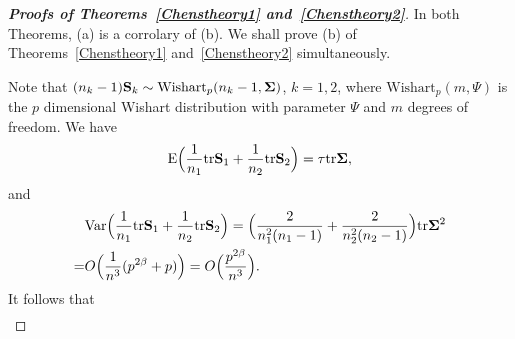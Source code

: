 \documentclass[times,sort&compress,3p]{elsarticle}
\newcommand{\mytr}{ {\rm tr} }
\newcommand{\myE}{ {\rm E} }
\newcommand{\myVar}{ {\rm Var} }
\theoremstyle{plain}
\theoremstyle{definition}
\theoremstyle{remark}
\begin{document}
\begin{appendices}
\begin{proof}[\textbf{Proofs of Theorems~\ref{Chenstheory1} and~\ref{Chenstheory2}}]
    In both Theorems, (a) is a corrolary of (b).
    We shall prove (b) of Theorems~\ref{Chenstheory1} and~\ref{Chenstheory2} simultaneously.
    
    Note that $(n_k-1)\BS_k\sim \text{Wishart}_p(n_k-1,\bSigma)$, $k=1,2$,
    where $\text{Wishart}_p(m,\Psi)$ is the $p$ dimensional Wishart distribution with parameter $\Psi$ and $m$ degrees of freedom.
    We have %
%
    $$
 \myE\Big(\frac{1}{n_1}\mytr \BS_1+\frac{1}{n_2}\mytr \BS_2\Big)=\tau \mytr\bSigma,
    $$
    and
    $$
    \begin{aligned}
        &\myVar\Big(\frac{1}{n_1}\mytr \BS_1+\frac{1}{n_2}\mytr \BS_2\Big)=
        \Big(\frac{2}{n_1^2(n_1-1)}+\frac{2}{n_2^2(n_2-1)}\Big)\mytr \bSigma^2\\
        =&
    O\Big(\frac{1}{n^3}(p^{2\beta}+p)\Big)=O\Big(\frac{p^{2\beta}}{n^3}\Big).
    \end{aligned}
    $$
    It follows that
    $$
    \begin{aligned}

\end{aligned}$$
\end{proof}
\end{appendices}
\end{document}
